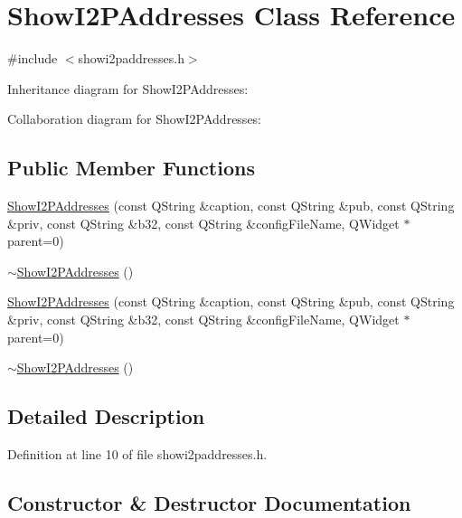 \hypertarget{class_show_i2_p_addresses}{}\section{Show\+I2\+P\+Addresses Class Reference}
\label{class_show_i2_p_addresses}


{\ttfamily \#include $<$showi2paddresses.\+h$>$}



Inheritance diagram for Show\+I2\+P\+Addresses\+:


Collaboration diagram for Show\+I2\+P\+Addresses\+:
\subsection*{Public Member Functions}
\begin{DoxyCompactItemize}
\item 
\hyperlink{class_show_i2_p_addresses_a3e179105873e6a9a0d196baae99dff24}{Show\+I2\+P\+Addresses} (const Q\+String \&caption, const Q\+String \&pub, const Q\+String \&priv, const Q\+String \&b32, const Q\+String \&config\+File\+Name, Q\+Widget $\ast$parent=0)
\item 
\hyperlink{class_show_i2_p_addresses_aa656299035626d75777594accd83a05c}{$\sim$\+Show\+I2\+P\+Addresses} ()
\item 
\hyperlink{class_show_i2_p_addresses_a3e179105873e6a9a0d196baae99dff24}{Show\+I2\+P\+Addresses} (const Q\+String \&caption, const Q\+String \&pub, const Q\+String \&priv, const Q\+String \&b32, const Q\+String \&config\+File\+Name, Q\+Widget $\ast$parent=0)
\item 
\hyperlink{class_show_i2_p_addresses_aa656299035626d75777594accd83a05c}{$\sim$\+Show\+I2\+P\+Addresses} ()
\end{DoxyCompactItemize}


\subsection{Detailed Description}


Definition at line 10 of file showi2paddresses.\+h.



\subsection{Constructor \& Destructor Documentation}
\hypertarget{class_show_i2_p_addresses_a3e179105873e6a9a0d196baae99dff24}{}

